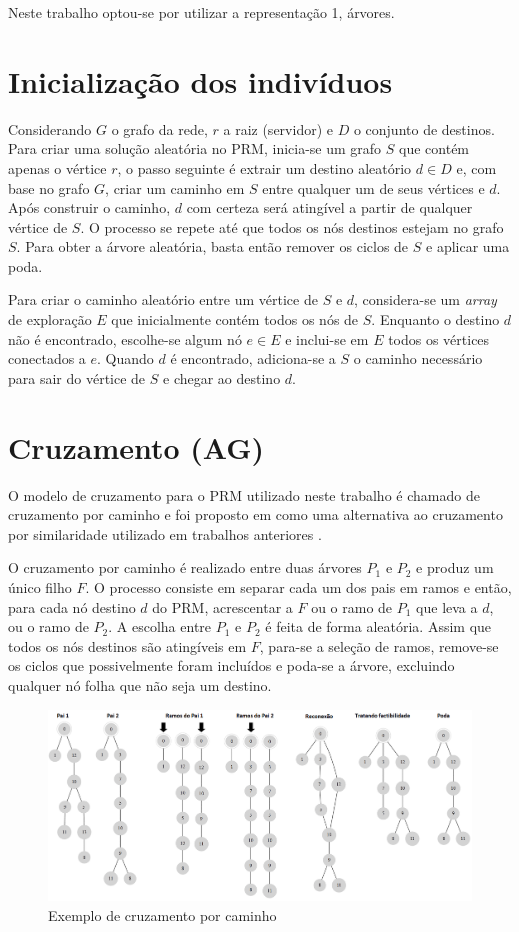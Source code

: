 Neste trabalho optou-se por utilizar a representação 1, árvores.

\section{Inicialização dos indivíduos}
Considerando $G$ o grafo da rede, $r$ a raiz (servidor) e $D$ o conjunto de destinos. Para criar uma solução aleatória no PRM, inicia-se um grafo $S$ que contém apenas o vértice $r$, o passo seguinte é extrair um destino aleatório $d \in D$ e, com base no grafo $G$, criar um caminho em $S$ entre qualquer um de seus vértices e $d$. Após construir o caminho, $d$ com certeza será atingível a partir de qualquer vértice de $S$. O processo se repete até que todos os nós destinos estejam no grafo $S$. Para obter a árvore aleatória, basta então remover os ciclos de $S$ e aplicar uma poda.

Para criar o caminho aleatório entre um vértice de $S$ e $d$, considera-se um \textit{array} de exploração $E$ que inicialmente contém todos os nós de $S$. Enquanto o destino $d$ não é encontrado, escolhe-se algum nó $e \in E$ e inclui-se em $E$ todos os vértices conectados a $e$. Quando $d$ é encontrado, adiciona-se a $S$ o caminho necessário para sair do vértice de $S$ e chegar ao destino $d$.

\section{Cruzamento (AG)}

O modelo de cruzamento para o PRM utilizado neste trabalho é chamado de cruzamento por caminho e foi proposto em \cite{Lafeta2016} como uma alternativa ao cruzamento por similaridade utilizado em trabalhos anteriores \cite{Bueno2010}.

O cruzamento por caminho é realizado entre duas árvores $P_1$ e $P_2$ e produz um único filho $F$. O processo consiste em separar cada um dos pais em ramos e então, para cada nó destino $d$ do PRM, acrescentar a $F$ ou o ramo de $P_1$ que leva a $d$, ou o ramo de $P_2$. A escolha entre $P_1$ e $P_2$ é feita de forma aleatória. Assim que todos os nós destinos são atingíveis em $F$, para-se a seleção de ramos, remove-se os ciclos que possivelmente foram incluídos e poda-se a árvore, excluindo qualquer nó folha que não seja um destino.

\begin{figure}[!htbp]
	\label{fig_prm-cruzamento-caminho}
	\caption{Exemplo de cruzamento por caminho}
	\centering
	\includegraphics[width=1\textwidth]{cap_estrategias-prm/figs/prm-cruzamento-caminho}
\end{figure}

